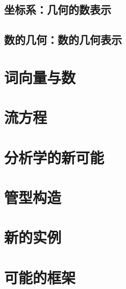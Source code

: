 \documentclass[a4paper,12pt]{article}
\begin{document}
\subsection{坐标系：几何的数表示}

\subsection{数的几何：数的几何表示}

\section{词向量与数}

\section{流方程}

\section{分析学的新可能}

\section{管型构造}

\section{新的实例}

\section{可能的框架}

\newpage
{}
{}


\end{document}
